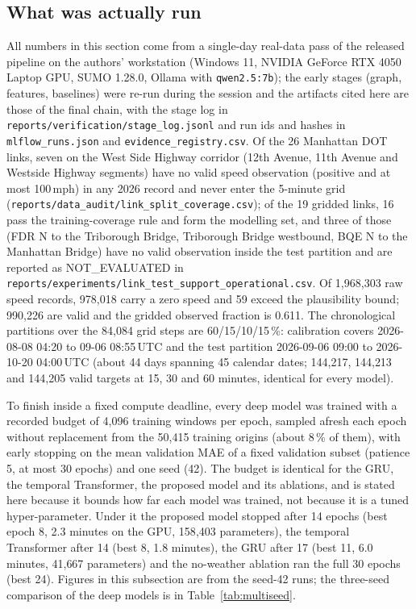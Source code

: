 \subsection{What was actually run}
\label{sec:res:run}
All numbers in this section come from a single-day real-data pass of the released pipeline on the authors'
workstation (Windows 11, NVIDIA GeForce RTX 4050 Laptop GPU, SUMO 1.28.0, Ollama with \texttt{qwen2.5:7b}); the
early stages (graph, features, baselines) were re-run during the session and the artifacts cited here are those of
the final chain, with the stage log in \texttt{reports/verification/stage\_log.jsonl} and run ids and hashes in
\texttt{mlflow\_runs.json} and \texttt{evidence\_registry.csv}. Of the 26 Manhattan DOT links, seven on the West
Side Highway corridor (12th Avenue, 11th Avenue and Westside Highway segments) have no valid speed observation
(positive and at most 100\,mph) in any 2026 record and never enter the 5-minute grid
(\texttt{reports/data\_audit/link\_split\_coverage.csv}); of the 19 gridded links, 16 pass the training-coverage rule and form the modelling set, and three of
those (FDR N to the Triborough Bridge, Triborough Bridge westbound, BQE N to the Manhattan Bridge) have no valid
observation inside the test partition and are reported as NOT\_EVALUATED in
\texttt{reports/experiments/link\_test\_support\_operational.csv}. Of 1{,}968{,}303 raw speed records, 978{,}018
carry a zero speed and 59 exceed the plausibility bound; 990{,}226 are valid and the gridded observed fraction is
0.611. The chronological partitions over the 84{,}084 grid steps are 60/15/10/15\,\%: calibration covers 2026-08-08
04:20 to 09-06 08:55\,UTC and the test partition 2026-09-06 09:00 to 2026-10-20 04:00\,UTC (about 44 days spanning 45 calendar dates; 144{,}217,
144{,}213 and 144{,}205 valid targets at 15, 30 and 60 minutes, identical for every model).

To finish inside a fixed compute deadline, every deep model was trained with a recorded budget of 4{,}096 training
windows per epoch, sampled afresh each epoch without replacement from the 50{,}415 training origins (about 8\,\% of
them), with early stopping on the mean validation MAE of a fixed validation subset (patience 5, at most 30 epochs)
and one seed (42). The budget is identical for
the GRU, the temporal Transformer, the proposed model and its ablations, and is stated here because it bounds how far
each model was trained, not because it is a tuned hyper-parameter. Under it the proposed model stopped after 14 epochs
(best epoch 8, 2.3 minutes on the GPU, 158{,}403 parameters), the temporal Transformer after 14 (best 8, 1.8 minutes),
the GRU after 17 (best 11, 6.0 minutes, 41{,}667 parameters) and the no-weather ablation ran the full 30 epochs (best
24). Figures in this subsection are from the seed-42 runs; the three-seed
comparison of the deep models is in Table~\ref{tab:multiseed}.


